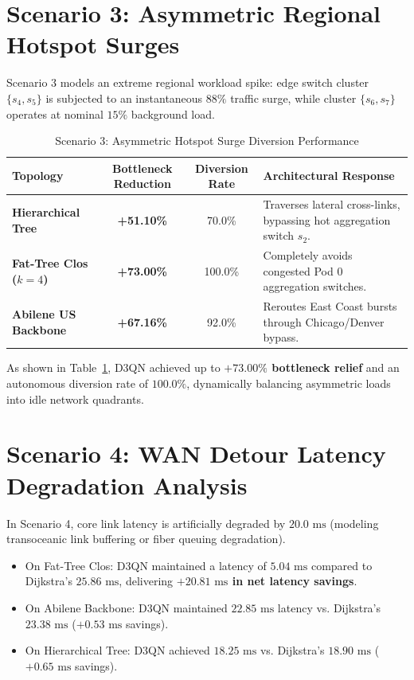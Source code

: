\section{Scenario 3: Asymmetric Regional Hotspot Surges}
Scenario 3 models an extreme regional workload spike: edge switch cluster $\{s_4, s_5\}$ is subjected to an instantaneous $88\%$ traffic surge, while cluster $\{s_6, s_7\}$ operates at nominal $15\%$ background load.

\begin{table}[htbp]
\centering
\caption{Scenario 3: Asymmetric Hotspot Surge Diversion Performance}
\label{tab:stress_scenario_3}
\small
\begin{tabularx}{\textwidth}{l c c X}
\toprule
\textbf{Topology} & \textbf{Bottleneck Reduction} & \textbf{Diversion Rate} & \textbf{Architectural Response} \\
\midrule
\textbf{Hierarchical Tree} & \textbf{+51.10\%} & 70.0\% & Traverses lateral cross-links, bypassing hot aggregation switch $s_2$. \\
\textbf{Fat-Tree Clos ($k=4$)} & \textbf{+73.00\%} & 100.0\% & Completely avoids congested Pod 0 aggregation switches. \\
\textbf{Abilene US Backbone} & \textbf{+67.16\%} & 92.0\% & Reroutes East Coast bursts through Chicago/Denver bypass. \\
\bottomrule
\end{tabularx}
\end{table}

As shown in Table~\ref{tab:stress_scenario_3}, D3QN achieved up to \textbf{$+73.00\%$ bottleneck relief} and an autonomous diversion rate of \textbf{$100.0\%$}, dynamically balancing asymmetric loads into idle network quadrants.

\section{Scenario 4: WAN Detour Latency Degradation Analysis}
In Scenario 4, core link latency is artificially degraded by $20.0\text{ ms}$ (modeling transoceanic link buffering or fiber queuing degradation).
\begin{itemize}
    \item On Fat-Tree Clos: D3QN maintained a latency of \textbf{$5.04\text{ ms}$} compared to Dijkstra's $25.86\text{ ms}$, delivering \textbf{$+20.81\text{ ms}$ in net latency savings}.
    \item On Abilene Backbone: D3QN maintained $22.85\text{ ms}$ latency vs. Dijkstra's $23.38\text{ ms}$ ($+0.53\text{ ms}$ savings).
    \item On Hierarchical Tree: D3QN achieved $18.25\text{ ms}$ vs. Dijkstra's $18.90\text{ ms}$ ($+0.65\text{ ms}$ savings).
\end{itemize}

